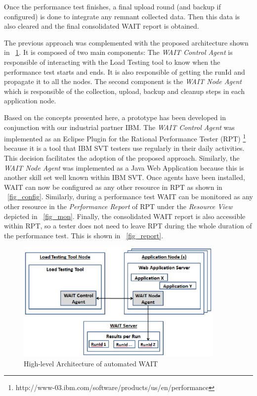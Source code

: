 \documentclass[runningheads,a4paper]{llncs}
\begin{document}
Once the performance test finishes, a final upload round (and backup if
configured) is done to integrate any remnant collected data. Then this data is
also cleared and the final consolidated WAIT report is obtained.

The previous approach was complemented with the proposed architecture shown in
\figurename ~\ref{fig_Arch}. It is composed of two main components: The
\emph{WAIT Control Agent} is responsible of interacting with the Load Testing
tool to know when the performance test starts and ends. It is also responsible
of getting the runId and propagate it to all the nodes. The second component is
the \emph{WAIT Node Agent} which is responsible of the collection, upload,
backup and cleanup steps in each application node.

Based on the concepts presented here, a prototype has been developed in
conjunction with our industrial partner IBM. The \emph{WAIT Control Agent} was
implemented as an Eclipse Plugin for the Rational Performance Tester (RPT)
\footnote{http://www-03.ibm.com/software/products/us/en/performance} because
it is a tool that IBM SVT testers use regularly in their daily
activities. This decision facilitates the adoption of the proposed approach.
Similarly, the \emph{WAIT Node Agent} was implemented as a Java Web Application because this is
another skill set well known within IBM SVT. Once agents have been installed,
WAIT can now be configured as any other resource in RPT as shown in \figurename ~\ref{fig_config}. Similarly, during a performance
test WAIT can be monitored as any other resource in the \emph{Performance
Report} of RPT under the \emph{Resource View} depicted in \figurename ~\ref{fig_mon}. 
Finally, the consolidated WAIT report is also accessible within RPT, so a tester
does not need to leave RPT during the whole duration of the performance test. This is
shown in \figurename ~\ref{fig_report}.

\vspace{-5pt}
\begin{figure}[!h]
\centering
\includegraphics[totalheight=.3\textheight,width=0.9\textwidth]{architecture_dwait}
\caption{High-level Architecture of automated WAIT}
\label{fig_Arch}
\end{figure}
\vspace{-5pt}
\end{document}
